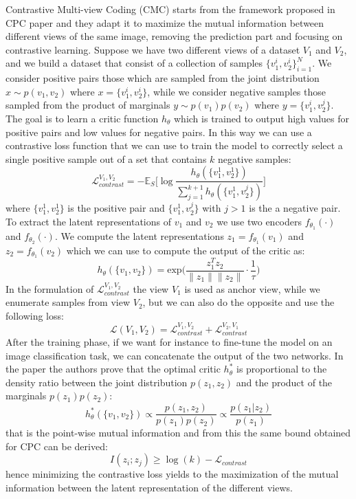 Contrastive Multi-view Coding (CMC) \cite{tian2020contrastive} starts from the framework proposed in CPC paper and they adapt it to maximize the mutual information between different views of the same image, removing the prediction part and focusing on contrastive learning. Suppose we have two different views of a dataset $V_1$ and $V_2$, and we build a dataset that consist of a collection of samples $\{v_1^i, v_2^i\}_{i=1}^N$. We consider positive pairs those which are sampled from the joint distribution $x \sim p(v_1, v_2)$ where $x= \{v_1^i, v_2^i\}$, while we consider negative samples those sampled from the product of marginals $y \sim p(v_1)p(v_2)$ where $y = \{v_1^i, v_2^j\}$. The goal is to learn a critic function $h_\theta$ which is trained to output high values for positive pairs and low values for negative pairs. In this way we can use a contrastive loss function that we can use to train the model to correctly select a single positive sample out of a set that contains $k$ negative samples:
\[\mathcal{L}^{V_1, V_2}_{contrast} = -\mathbb{E}_S \Bigg[ \log \frac{h_\theta(\{v_1^1, v_2^1 \})}{\sum_{j=1}^{k+1}h_\theta(\{v_1^1, v_2^j \})}  \Bigg] \]
where $\{v_1^1, v_2^1 \}$ is the positive pair and $\{v_1^1, v_2^j \}$ with $j > 1$ is the a negative pair. To extract the latent representations of $v_1$ and $v_2$ we use two encoders $f_{\theta_1}(\cdot)$ and $f_{\theta_2}(\cdot)$. We compute the latent representations $z_1 = f_{\theta_1}(v_1)$ and $z_2 = f_{\theta_1}(v_2)$ which we can use to compute the output of the critic as:
\[ h_\theta(\{v_1, v_2\}) = \text{exp}\Bigg(\frac{z_1^Tz_2}{\lVert z_1\rVert \lVert z_2\rVert}\cdot \frac{1}{\tau}\Bigg) \]
In the formulation of $\mathcal{L}^{V_1, V_2}_{contrast}$ the view $V_1$ is used as anchor view, while we enumerate samples from view $V_2$, but we can also do the opposite and use the following loss:
\[ \mathcal{L}(V_1, V_2) = \mathcal{L}^{V_1, V_2}_{contrast} + \mathcal{L}^{V_2, V_1}_{contrast} \]
After the training phase, if we want for instance to fine-tune the model on an image classification task, we can concatenate the output of the two networks.
In the paper the authors prove that the optimal critic $h^*_\theta$ is proportional to the density ratio between the joint distribution $p(z_1, z_2)$ and the product of the marginals $p(z_1)p(z_2)$:
\[ h^*_\theta(\{ v_1,v_2\}) \propto \frac{p(z_1, z_2)}{p(z_1)p(z_2)} \propto \frac{p(z_1|z_2)}{p(z_1)} \]
that is the point-wise mutual information and from this the same bound obtained for CPC can be derived:
\[I(z_i;z_j) \ge \log(k) - \mathcal{L}_{contrast} \]
hence minimizing the contrastive loss yields to the maximization of the mutual information between the latent representation of the different views. 

